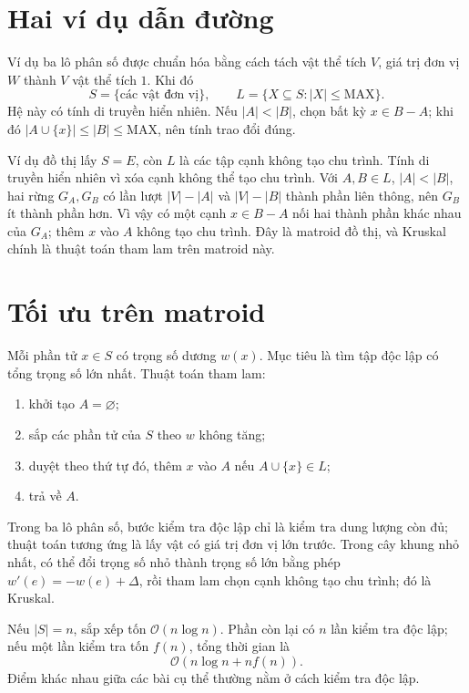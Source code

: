 \documentclass[11pt]{article}
\newcommand{\Oh}{\mathcal{O}}
\begin{document}
\section{Hai ví dụ dẫn đường}

Ví dụ ba lô phân số được chuẩn hóa bằng cách tách vật thể tích \(V\), giá trị
đơn vị \(W\) thành \(V\) vật thể tích \(1\). Khi đó
\[
  S=\{\text{các vật đơn vị}\},\qquad
  L=\{X\subseteq S: |X|\le \mathrm{MAX}\}.
\]
Hệ này có tính di truyền hiển nhiên. Nếu \(|A|<|B|\), chọn bất kỳ
\(x\in B-A\); khi đó \(|A\cup\{x\}|\le |B|\le \mathrm{MAX}\), nên tính trao
đổi đúng.

Ví dụ đồ thị lấy \(S=E\), còn \(L\) là các tập cạnh không tạo chu trình. Tính
di truyền hiển nhiên vì xóa cạnh không thể tạo chu trình. Với
\(A,B\in L\), \(|A|<|B|\), hai rừng \(G_A,G_B\) có lần lượt
\(|V|-|A|\) và \(|V|-|B|\) thành phần liên thông, nên \(G_B\) ít thành phần
hơn. Vì vậy có một cạnh \(x\in B-A\) nối hai thành phần khác nhau của
\(G_A\); thêm \(x\) vào \(A\) không tạo chu trình. Đây là matroid đồ thị, và
Kruskal chính là thuật toán tham lam trên matroid này.

\section{Tối ưu trên matroid}

Mỗi phần tử \(x\in S\) có trọng số dương \(w(x)\). Mục tiêu là tìm tập độc
lập có tổng trọng số lớn nhất. Thuật toán tham lam:
\begin{enumerate}
  \item khởi tạo \(A=\varnothing\);
  \item sắp các phần tử của \(S\) theo \(w\) không tăng;
  \item duyệt theo thứ tự đó, thêm \(x\) vào \(A\) nếu
  \(A\cup\{x\}\in L\);
  \item trả về \(A\).
\end{enumerate}

Trong ba lô phân số, bước kiểm tra độc lập chỉ là kiểm tra dung lượng còn đủ;
thuật toán tương ứng là lấy vật có giá trị đơn vị lớn trước. Trong cây khung
nhỏ nhất, có thể đổi trọng số nhỏ thành trọng số lớn bằng phép
\(w'(e)=-w(e)+\Delta\), rồi tham lam chọn cạnh không tạo chu trình; đó là
Kruskal.

Nếu \(|S|=n\), sắp xếp tốn \(\Oh(n\log n)\). Phần còn lại có \(n\) lần kiểm
tra độc lập; nếu một lần kiểm tra tốn \(f(n)\), tổng thời gian là
\[
  \Oh(n\log n+n f(n)).
\]
Điểm khác nhau giữa các bài cụ thể thường nằm ở cách kiểm tra độc lập.
\end{document}
